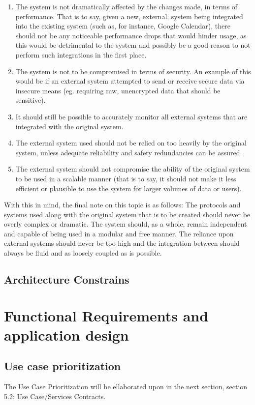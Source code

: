 \documentclass[10pt,a4paper]{exam}
\begin{document}
\begin{enumerate}
	\item The system is not dramatically affected by the changes made, in terms of performance. That is to say, given a new, external, system being integrated into the existing system (such as, for instance, Google Calendar), there should not be any noticeable performance drops that would hinder usage, as this would be detrimental to the system and possibly be a good reason to not perform such integrations in the first place.
	\item The system is not to be compromised in terms of security. An example of this would be if an external system attempted to send or receive secure data via insecure means (eg. requiring raw, unencrypted data that should be sensitive).
	\item It  should still be possible to accurately monitor all external systems that are integrated with the original system.
	\item The external system used should not be relied on too heavily by the original system, unless adequate reliability and safety redundancies can be assured.
	\item The external system should not compromise the ability of the original system to be used in a scalable manner (that is to say, it should not make it less efficient or plausible to use the system for larger volumes of data or users).
\end{enumerate}
With this in mind, the final note on this topic is as follows: The protocols and systems used along with the original system that is to be created should never be overly complex or dramatic. The system should, as a whole, remain independent and capable of being used in a modular and free manner. The reliance upon external systems should never be too high and the integration between should always be fluid and as loosely coupled as is possible.

\subsection{Architecture Constrains}
\lipsum[5]

\section{Functional Requirements and application design}
\subsection{Use case prioritization}
The Use Case Prioritization will be ellaborated upon in the next section, section 5.2: Use Case/Services Contracts.
\end{document}
